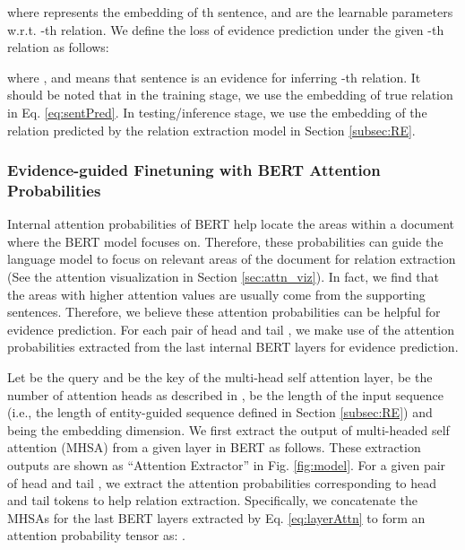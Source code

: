 \documentclass[11pt,a4paper]{article}
\begin{document}
where  represents the embedding of th sentence,  and  are the learnable parameters w.r.t. -th relation.
We define the loss of evidence prediction under the given -th relation as follows:

where , and   means that sentence  is an evidence for inferring -th relation.
It should be noted that in the training stage, we use the embedding of true relation in Eq. \ref{eq:sentPred}. In testing/inference stage, we use the embedding of the relation predicted by the relation extraction model in Section \ref{subsec:RE}.

\subsubsection{Evidence-guided Finetuning with BERT Attention Probabilities}\label{subsec:evid-bert}



Internal attention probabilities of BERT help locate the areas within a document where the BERT model focuses on. 
Therefore, these probabilities can guide the language model to focus on relevant areas of the document for relation extraction (See the attention visualization in Section \ref{sec:attn_viz}). 
In fact, we find that the areas with higher attention values are usually come from the supporting sentences. Therefore, we believe these attention probabilities can be helpful for evidence prediction. 
For each pair of head  and tail , we make use of the attention probabilities extracted from the last  internal BERT layers for evidence prediction.

Let  be the query and  be the key of the multi-head self attention layer,  be the number of attention heads as described in \cite{Vaswani17transformers},  be the length of the input sequence (i.e., the length of entity-guided sequence defined in Section \ref{subsec:RE}) and  being the embedding dimension.
We first extract the output of multi-headed self attention (MHSA)  from a given layer in BERT as follows. 
These extraction outputs are shown as ``Attention Extractor'' in Fig. \ref{fig:model}. 
For a given pair of head  and tail , we extract the attention probabilities corresponding to head and tail tokens to help relation extraction. Specifically, we concatenate the MHSAs for the last  BERT layers extracted by Eq. \ref{eq:layerAttn} to form an attention probability tensor as: .
\end{document}

